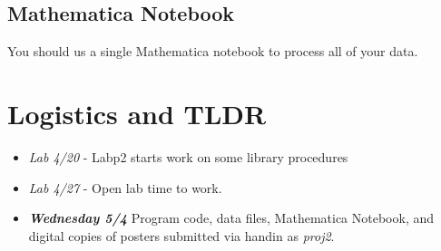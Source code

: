 \documentclass[]{tufte-handout}
\begin{document}
\subsection{Mathematica Notebook}

You should us a single Mathematica notebook to process all of your data. 

\section{Logistics and TLDR}


\begin{itemize}
\item \textit{Lab 4/20} - Labp2 starts work on some library procedures 
\item \textit{Lab 4/27} - Open lab time to work. 
\item \textit{\textbf{Wednesday 5/4}} Program code, data files, Mathematica Notebook, and digital copies of posters submitted via handin as \textit{proj2}. 
\end{itemize}
\end{document}
